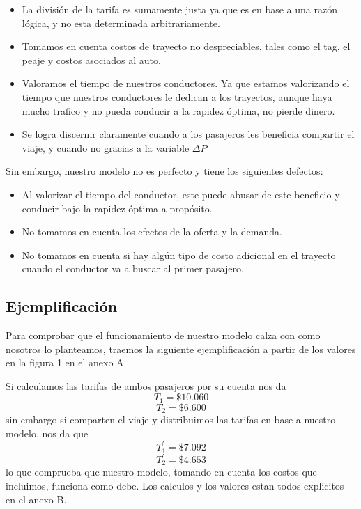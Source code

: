 \documentclass[12pt]{report}
\begin{document}
\begin{itemize}
     \item La división de la tarifa es sumamente justa ya que es en base a una razón lógica, y no esta determinada arbitrariamente.
     \item Tomamos en cuenta costos de trayecto no despreciables, tales como el tag, el peaje y costos asociados al auto.
     \item Valoramos el tiempo de nuestros conductores. Ya que estamos valorizando el tiempo que nuestros conductores le dedican a los trayectos, aunque haya mucho trafico y no pueda conducir a la rapidez óptima, no pierde dinero.
     \item Se logra discernir claramente cuando a los pasajeros les beneficia compartir el viaje, y cuando no gracias a la variable $\Delta P$
\end{itemize}

Sin embargo, nuestro modelo no es perfecto y tiene los siguientes defectos:

\begin{itemize}
    \item Al valorizar el tiempo del conductor, este puede abusar de este beneficio y conducir bajo la rapidez óptima a propósito.
    \item No tomamos en cuenta los efectos de la oferta y la demanda. 
    \item No tomamos en cuenta si hay algún tipo de costo adicional en el trayecto cuando el conductor va a buscar al primer pasajero.
\end{itemize}


\subsection*{Ejemplificación}
Para comprobar que el funcionamiento de nuestro modelo calza con como nosotros lo planteamos, traemos la siguiente ejemplificación a partir de los valores en la figura 1 en el anexo A.

Si calculamos las tarifas de ambos pasajeros por su cuenta nos da $$T_{1}=\$10.060$$ $$T_2=\$6.600$$ sin embargo si comparten el viaje y distribuimos las tarifas en base a nuestro modelo, nos da que $$T^{'}_{1}=\$7.092$$ $$T^{'}_{2}=\$4.653$$ lo que comprueba que nuestro modelo, tomando en cuenta los costos que incluimos, funciona como debe. Los calculos y los valores estan todos explicitos en el anexo B.
\end{document}
